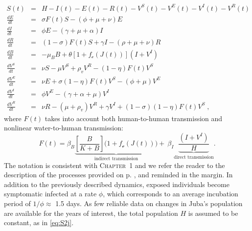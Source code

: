 \begingroup
\allowdisplaybreaks
\begin{eqnarray} \label{eq:fullmodel}
S(t) &=& H - I(t) - E(t) - R(t) - V^S(t) - V^E(t) - V^I(t) - V^R(t) \label{eq:S2j} \\
 \frac{dE}{dt} &=& \sigma F(t) S - (\phi + \mu +\nu) E \label{eq:E2j}\\
 \frac{dI}{dt} &=& \phi E - (\gamma + \mu + \alpha) I \label{eq:I2j}\\
 \frac{dR}{dt} &=& (1-\sigma) F(t) S + \gamma I - (\rho + \mu+\nu) R \label{eq:R2j}\\
 \frac{dB}{dt} &=& - \mu_B B +\theta\left[1 + f_{\mathcal{c}}\left(J(t)\right) \right] (I+V^I)\label{eq:B2}\\
\frac{dV^S}{dt} &=& \nu S - \mu V^S+ \rho_{v} V^R - (1-\eta) F(t) V^S \label{eq:VS2j}\\
 \frac{dV^E}{dt} &=& \nu E + \sigma (1-\eta) F(t) V^S-(\phi + \mu) V^E \label{eq:VE2}\\
 \frac{dV^I}{dt} &=&  \phi V^E -(\gamma + \alpha + \mu) V^I \label{eq:VI2j}\\
 \frac{dV^R}{dt} &=& \nu R -(\mu +\rho_{v})V^R +\gamma V^I +(1-\sigma) (1-\eta) F(t) V^S\label{eq:VR2j}\; ,
\end{eqnarray}
\endgroup
where $F(t)$ takes into account both human-to-human transmission and nonlinear water-to-human transmission:
\begin{equation}
  F(t) = \beta_B \underbrace{ \left[\frac{B}{K + B} \right] \bigg(1+f_{\mathcal{e}}\left(J(t)\right)\bigg)}_{\text{indirect transmission}} + ~\beta_{I} \underbrace{\frac{(I+V^I)}{H}}_{\text{direct transmission}}.
\label{eq:force2}
\end{equation}
 The notation is consistent with \textsc{Chapter~1} and we refer the reader to the description of the processes provided on p. \pageref{eq:I2}, and reminded in the margin. In addition to the previously described dynamics, exposed individuals become symptomatic infected at a rate $\phi$, which corresponds to an average incubation period of $1/\phi\approx$ 1.5 days\cite{Azman:IncubationPeriodCholera:2013}. As few reliable data on changes in Juba's population are available for the years of interest, the total population $H$ is assumed to be constant, as in \eqref{eq:S2j}. 
 
